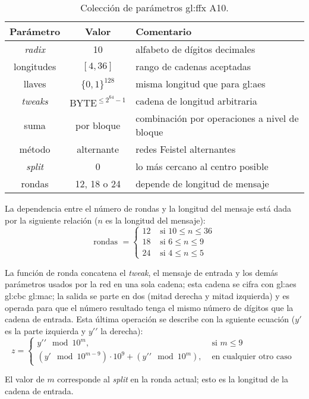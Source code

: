 \begin{table}
  \centering
  \begin{tabular}{| c | c | l |}
    \hline
    \textbf{Parámetro} &
    \textbf{Valor} &
    \textbf{Comentario} \\
    \hline

    \textit{radix}  & 10 & alfabeto de dígitos decimales \\
    \hline

    longitudes & $ [ 4, 36 ] $ & rango de cadenas aceptadas \\
    \hline

    llaves & $ \{ 0, 1\}^{128} $ & misma longitud que para \gls{gl:aes} \\
    \hline

    \textit{tweaks} & $ \text{BYTE}^{\leq 2^{64} - 1} $ & cadena de longitud
    arbitraria \\
    \hline

    suma & por bloque & combinación por operaciones a nivel de bloque \\
    \hline

    método & alternante & redes Feistel alternantes \\
    \hline

    \textit{split} & 0 & lo más cercano al centro posible \\
    \hline

    rondas & 12, 18 o 24 & depende de longitud de mensaje \\
    \hline

  \end{tabular}
  \caption{Colección de parámetros \gls{gl:ffx} A10.}
  \label{ffx_a10}
\end{table}

La dependencia entre el número de rondas y la longitud del mensaje está dada
por la siguiente relación ($ n $ es la longitud del mensaje):
\begin{equation}
  \text{rondas } =
  \begin{cases}
    12 & \text{ si } 10 \leq n \leq 36 \\
    18 & \text{ si } 6  \leq n \leq 9 \\
    24 & \text{ si } 4  \leq n \leq 5
  \end{cases}
\end{equation}

La función de ronda concatena el \textit{tweak}, el mensaje de entrada y los
demás parámetros usados por la red en una sola cadena; esta cadena se cifra con
\gls{gl:aes} \gls{gl:cbc} \gls{gl:mac}; la salida se parte en dos (mitad derecha
y mitad izquierda) y es operada para que el número resultado tenga el mismo
número de dígitos que la cadena de entrada. Esta última operación se describe
con la sguiente ecuación ($y\prime$ es la parte izquierda y $ y\prime\prime $
la derecha):
\begin{equation}
  z =
  \begin{cases}
    y\prime\prime \mod 10^{m}, & \text{ si } m \leq 9 \\
    (y\prime \mod 10^{m - 9}) \cdot 10^{9} + (y\prime\prime \mod 10^{m}),
    & \text{ en cualquier otro caso }
  \end{cases}
\end{equation}

El valor de $ m $ corresponde al \textit{split} en la ronda actual; esto es
la longitud de la cadena de entrada.
